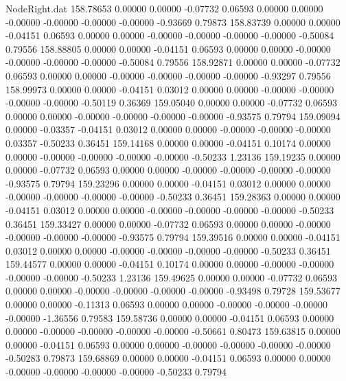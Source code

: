 \begin{filecontents}{NodeRight.dat}
 158.78653    0.00000    0.00000    -0.07732    0.06593    0.00000    0.00000   -0.00000   -0.00000   -0.00000   -0.00000   -0.93669    0.79873
 158.83739    0.00000    0.00000    -0.04151    0.06593    0.00000    0.00000   -0.00000   -0.00000   -0.00000   -0.00000   -0.50084    0.79556
 158.88805    0.00000    0.00000    -0.04151    0.06593    0.00000    0.00000   -0.00000   -0.00000   -0.00000   -0.00000   -0.50084    0.79556
 158.92871    0.00000    0.00000    -0.07732    0.06593    0.00000    0.00000   -0.00000   -0.00000   -0.00000   -0.00000   -0.93297    0.79556
 158.99973    0.00000    0.00000    -0.04151    0.03012    0.00000    0.00000   -0.00000   -0.00000   -0.00000   -0.00000   -0.50119    0.36369
 159.05040    0.00000    0.00000    -0.07732    0.06593    0.00000    0.00000   -0.00000   -0.00000   -0.00000   -0.00000   -0.93575    0.79794
 159.09094    0.00000   -0.03357    -0.04151    0.03012    0.00000    0.00000   -0.00000   -0.00000   -0.00000    0.03357   -0.50233    0.36451
 159.14168    0.00000    0.00000    -0.04151    0.10174    0.00000    0.00000   -0.00000   -0.00000   -0.00000   -0.00000   -0.50233    1.23136
 159.19235    0.00000    0.00000    -0.07732    0.06593    0.00000    0.00000   -0.00000   -0.00000   -0.00000   -0.00000   -0.93575    0.79794
 159.23296    0.00000    0.00000    -0.04151    0.03012    0.00000    0.00000   -0.00000   -0.00000   -0.00000   -0.00000   -0.50233    0.36451
 159.28363    0.00000    0.00000    -0.04151    0.03012    0.00000    0.00000   -0.00000   -0.00000   -0.00000   -0.00000   -0.50233    0.36451
 159.33427    0.00000    0.00000    -0.07732    0.06593    0.00000    0.00000   -0.00000   -0.00000   -0.00000   -0.00000   -0.93575    0.79794
 159.39516    0.00000    0.00000    -0.04151    0.03012    0.00000    0.00000   -0.00000   -0.00000   -0.00000   -0.00000   -0.50233    0.36451
 159.44577    0.00000    0.00000    -0.04151    0.10174    0.00000    0.00000   -0.00000   -0.00000   -0.00000   -0.00000   -0.50233    1.23136
 159.49625    0.00000    0.00000    -0.07732    0.06593    0.00000    0.00000   -0.00000   -0.00000   -0.00000   -0.00000   -0.93498    0.79728
 159.53677    0.00000    0.00000    -0.11313    0.06593    0.00000    0.00000   -0.00000   -0.00000   -0.00000   -0.00000   -1.36556    0.79583
 159.58736    0.00000    0.00000    -0.04151    0.06593    0.00000    0.00000   -0.00000   -0.00000   -0.00000   -0.00000   -0.50661    0.80473
 159.63815    0.00000    0.00000    -0.04151    0.06593    0.00000    0.00000   -0.00000   -0.00000   -0.00000   -0.00000   -0.50283    0.79873
 159.68869    0.00000    0.00000    -0.04151    0.06593    0.00000    0.00000   -0.00000   -0.00000   -0.00000   -0.00000   -0.50233    0.79794

\end{filecontents}
